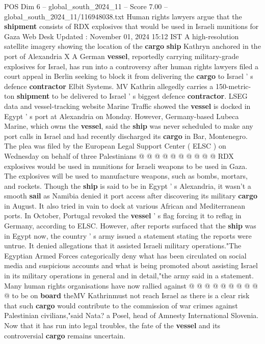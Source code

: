 \begin{textsample}{POS Dim 6 – global\_south\_2024\_11 – Score 7.00 – global\_south\_2024\_11/116948038.txt}  \label{ex:f6_pos_387}
Human rights lawyers argue that the \textbf{shipment} consists of RDX explosives that would be used in Israeli munitions for Gaza Web Desk Updated : November 01, 2024 15:12 IST A high-resolution satellite imagery showing the location of the \textbf{cargo} \textbf{ship} Kathryn anchored in the port of Alexandria X A German \textbf{vessel}, reportedly carrying military-grade explosives for Israel, has run into a controversy after human rights lawyers filed a court appeal in Berlin seeking to block it from delivering the \textbf{cargo} to Israel ' s defence \textbf{contractor} Elbit Systems.
MV Kathrin allegedly carries a 150-metric-ton \textbf{shipment} to be delivered to Israel ' s biggest defence \textbf{contractor}.
LSEG data and vessel-tracking website Marine Traffic showed the \textbf{vessel} is docked in Egypt ' s port at Alexandria on Monday.
However, Germany-based Lubeca Marine, which owns the \textbf{vessel}, said the \textbf{ship} was never scheduled to make any port calls in Israel and had recently discharged its \textbf{cargo} in Bar, Montenegro.
The plea was filed by the European Legal Support Center ( ELSC ) on Wednesday on behalf of three Palestinians @ @ @ @ @ @ @ @ @ @ RDX explosives would be used in munitions for Israeli weapons to be used in Gaza.
The explosives will be used to manufacture weapons, such as bombs, mortars, and rockets.
Though the \textbf{ship} is said to be in Egypt ' s Alexandria, it wasn't a smooth \textbf{sail} as Namibia denied it port access after discovering its military \textbf{cargo} in August.
It also tried in vain to dock at various African and Mediterranean ports.
In October, Portugal revoked the \textbf{vessel} ' s flag forcing it to reflag in Germany, according to ELSC.
However, after reports surfaced that the \textbf{ship} was in Egypt now, the country ' s army issued a statement stating the reports were untrue.
It denied allegations that it assisted Israeli military operations."The Egyptian Armed Forces categorically deny what has been circulated on social media and suspicious accounts and what is being promoted about assisting Israel in its military operations in general and in detail,"the army said in a statement.
Many human rights organisations have now rallied against @ @ @ @ @ @ @ @ @ @ to be on \textbf{board} theMV Kathrinmust not reach Israel as there is a clear risk that such \textbf{cargo} would contribute to the commission of war crimes against Palestinian civilians,"said Nata? a Posel, head of Amnesty International Slovenia.
Now that it has run into legal troubles, the fate of the \textbf{vessel} and its controversial \textbf{cargo} remains uncertain.

\end{textsample}
